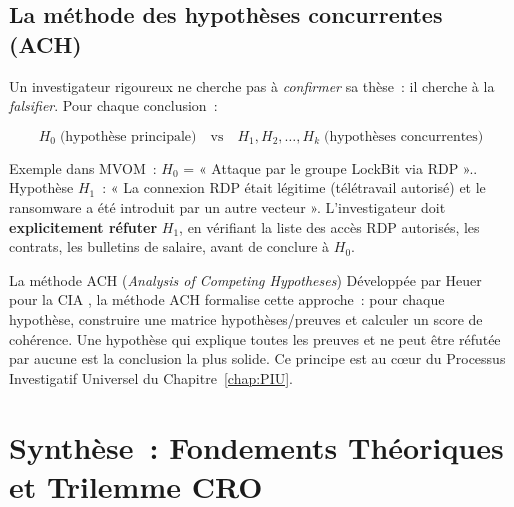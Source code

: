 \subsection{La méthode des hypothèses concurrentes (ACH)}

Un investigateur rigoureux ne cherche pas à \emph{confirmer} sa thèse~:
il cherche à la \emph{falsifier}. Pour chaque conclusion~:

\begin{equation}
H_0 \;\text{(hypothèse principale)} \quad \text{vs} \quad
H_1, H_2, \ldots, H_k \;\text{(hypothèses concurrentes)}
\label{eq:hypotheses}
\end{equation}

Exemple dans MVOM~: $H_0$ = « Attaque par le groupe LockBit via RDP »..
Hypothèse $H_1$~: « La connexion RDP était légitime (télétravail autorisé)
et le ransomware a été introduit par un autre vecteur ». L'investigateur
doit \textbf{explicitement réfuter} $H_1$, en vérifiant la liste des
accès RDP autorisés, les contrats, les bulletins de salaire, avant
de conclure à $H_0$.

\begin{boiteRemarque}{La méthode ACH (\textit{Analysis of Competing Hypotheses})}
Développée par Heuer pour la CIA \cite{heuer1999}, la méthode ACH formalise
cette approche~: pour chaque hypothèse, construire une matrice hypothèses/preuves
et calculer un score de cohérence. Une hypothèse qui explique toutes les preuves
et ne peut être réfutée par aucune est la conclusion la plus solide. Ce principe
est au cœur du Processus Investigatif Universel du
Chapitre~\ref{chap:PIU}.
\end{boiteRemarque}

\section{Synthèse~: Fondements Théoriques et Trilemme CRO}
\label{sec:fondements-cro}

